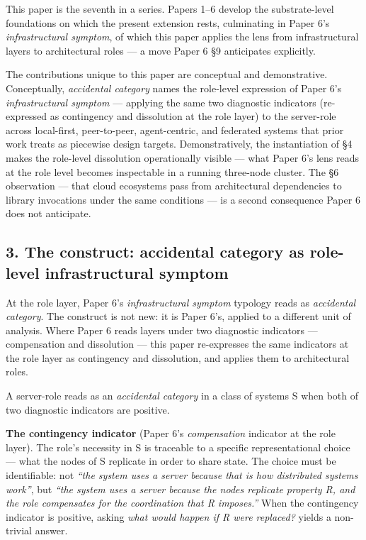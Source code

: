 \documentclass[
]{article}
\begin{document}
This paper is the seventh in a series. Papers 1--6 develop the
substrate-level foundations on which the present extension rests,
culminating in Paper 6's \emph{infrastructural symptom}, of which this
paper applies the lens from infrastructural layers to architectural
roles --- a move Paper 6 §9 anticipates explicitly.

The contributions unique to this paper are conceptual and demonstrative.
Conceptually, \emph{accidental category} names the role-level expression
of Paper 6's \emph{infrastructural symptom} --- applying the same two
diagnostic indicators (re-expressed as contingency and dissolution at
the role layer) to the server-role across local-first, peer-to-peer,
agent-centric, and federated systems that prior work treats as piecewise
design targets. Demonstratively, the instantiation of §4 makes the
role-level dissolution operationally visible --- what Paper 6's lens
reads at the role level becomes inspectable in a running three-node
cluster. The §6 observation --- that cloud ecosystems pass from
architectural dependencies to library invocations under the same
conditions --- is a second consequence Paper 6 does not anticipate.

\subsection{3. The construct: accidental category as role-level
infrastructural
symptom}\label{the-construct-accidental-category-as-role-level-infrastructural-symptom}

At the role layer, Paper 6's \emph{infrastructural symptom} typology
reads as \emph{accidental category}. The construct is not new: it is
Paper 6's, applied to a different unit of analysis. Where Paper 6 reads
layers under two diagnostic indicators --- compensation and dissolution
--- this paper re-expresses the same indicators at the role layer as
contingency and dissolution, and applies them to architectural roles.

A server-role reads as an \emph{accidental category} in a class of
systems S when both of two diagnostic indicators are positive.

\textbf{The contingency indicator} (Paper 6's \emph{compensation}
indicator at the role layer). The role's necessity in S is traceable to
a specific representational choice --- what the nodes of S replicate in
order to share state. The choice must be identifiable: not \emph{``the
system uses a server because that is how distributed systems work''},
but \emph{``the system uses a server because the nodes replicate
property R, and the role compensates for the coordination that R
imposes.''} When the contingency indicator is positive, asking
\emph{what would happen if R were replaced?} yields a non-trivial
answer.
\end{document}
